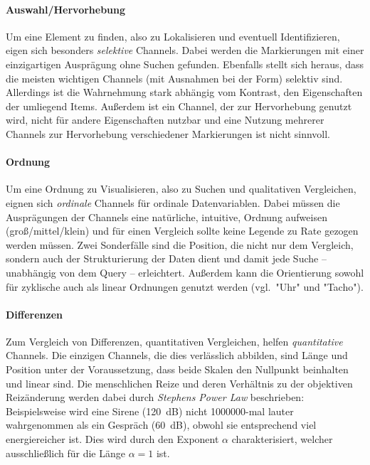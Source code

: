 			\paragraph{Auswahl/Hervorhebung}
				Um eine Element zu finden, also zu Lokalisieren und eventuell Identifizieren, eigen sich besonders \emph{selektive} Channels. Dabei werden die Markierungen mit einer einzigartigen Ausprägung ohne Suchen gefunden. Ebenfalls stellt sich heraus, dass die meisten wichtigen Channels (mit Ausnahmen bei der Form) selektiv sind. Allerdings ist die Wahrnehmung stark abhängig vom Kontrast, \dh den Eigenschaften der umliegend Items. Außerdem ist ein Channel, der zur Hervorhebung genutzt wird, nicht für andere Eigenschaften nutzbar und eine Nutzung mehrerer Channels zur Hervorhebung verschiedener Markierungen ist nicht sinnvoll.

			\paragraph{Ordnung}
				Um eine Ordnung zu Visualisieren, also zu Suchen und qualitativen Vergleichen, eignen sich \emph{ordinale} Channels für ordinale Datenvariablen. Dabei müssen die Ausprägungen der Channels eine natürliche, intuitive, Ordnung aufweisen (\zB groß/mittel/klein) und für einen Vergleich sollte keine Legende zu Rate gezogen werden müssen. Zwei Sonderfälle sind die Position, die nicht nur dem Vergleich, sondern auch der Strukturierung der Daten dient und damit jede Suche -- unabhängig von dem Query -- erleichtert. Außerdem kann die Orientierung sowohl für zyklische auch als linear Ordnungen genutzt werden (vgl.~"Uhr" und "Tacho").

			\paragraph{Differenzen}
				Zum Vergleich von Differenzen, \dh quantitativen Vergleichen, helfen \emph{quantitative} Channels. Die einzigen Channels, die dies verlässlich abbilden, sind Länge und Position unter der Voraussetzung, dass beide Skalen den Nullpunkt beinhalten und linear sind. Die menschlichen Reize und deren Verhältnis zu der objektiven Reizänderung werden dabei durch \emph{Stephens Power Law} beschrieben: Beispielsweise wird eine Sirene (\SI{120}{\deci\bel}) nicht \num{1000000}-mal lauter wahrgenommen als ein Gespräch (\SI{60}{\deci\bel}), obwohl sie entsprechend viel energiereicher ist. Dies wird durch den Exponent \(\alpha\) charakterisiert, welcher ausschließlich für die Länge \(\alpha = 1\) ist.

